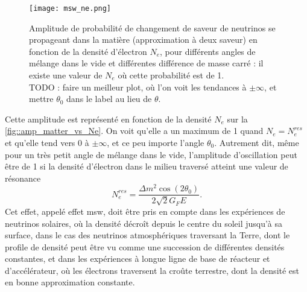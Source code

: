             \begin{figure}
            	\texttt{[image: msw\_ne.png]}
            	\caption[Effet de résonnance \gls{msw}]{\label{fig::amp_matter_vs_Ne}Amplitude de probabilité de changement de saveur de neutrinos se propageant dans la matière (approximation à deux saveur) en fonction de la densité d'électron $N_e$, pour différents angles de mélange dans le vide et différentes différence de masse carré : il existe une valeur de $N_e$ où cette probabilité est de 1.\\
            		TODO : faire un meilleur plot, où l'on voit les tendances à $\pm\infty$, et mettre $\theta_0$ dans le label au lieu de $\theta$.}
            \end{figure}
            Cette amplitude est représenté en fonction de la densité $N_e$ sur la \autoref{fig::amp_matter_vs_Ne}. On voit qu'elle a un maximum de 1 quand $N_e = N_e^{res}$ et qu'elle tend vers 0 à $\pm\infty$, et ce peu importe l'angle $\theta_0$. Autrement dit, même pour un très petit angle de mélange dans le vide, l'amplitude d'oscillation peut être de 1 si la densité d'électron dans le milieu traversé atteint une valeur de résonance
            \begin{equation}\label{eq::MSW_condition}
                N_e^{res}=\frac{\Delta m^2\cos(2\theta_0)}{2\sqrt{2}G_F E}.%
            \end{equation}
            Cet effet, appelé effet \gls{msw}, doit être pris en compte dans les expériences de neutrinos solaires, où la densité décroît depuis le centre du soleil jusqu'à sa surface, dans le cas des neutrinos atmosphériques traversant la Terre, dont le profile de densité peut être vu comme une succession de différentes densités constantes, et dans les expériences à longue ligne de base de réacteur et d'accélérateur, où les électrons traversent la croûte terrestre, dont la densité est en bonne approximation constante.
            
            
